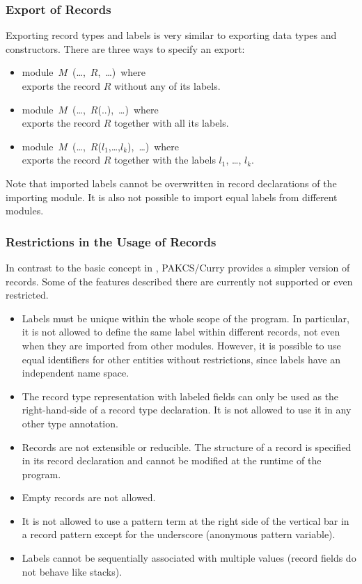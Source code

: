 \documentclass[11pt,fleqn]{article}
\renewcommand{\tt}{\usefont{OT1}{cmtt}{m}{n}\selectfont}
\newcommand{\codefont}{\tt}
\newcommand{\code}[1]{\mbox{\codefont #1}}
\begin{document}
\subsubsection{Export of Records}
\label{sec-exprecs}

Exporting record types and labels is very similar to exporting
data types and constructors. There are three ways 
to specify an export:
\begin{itemize}
\item \code{module $M$ (\ldots, $R$, \ldots) where} \\
  exports the record $R$ without any of its labels.
\item \code{module $M$ (\ldots, $R$(..), \ldots) where} \\
  exports the record $R$ together with all its labels.
\item \code{module $M$ (\ldots, $R$($l_1$,\ldots,$l_k$), \ldots) where} \\
  exports the record $R$ together with the labels $l_1$, \ldots, $l_k$.
\end{itemize}
%
Note that imported labels cannot be overwritten in record declarations
of the importing module. It is also not possible to import equal labels
from different modules.


\subsubsection{Restrictions in the Usage of Records}
\label{sec-restrinrecs}

In contrast to the basic concept in \cite{Leijen05}, PAKCS/Curry provides a
simpler version of records. Some of the features described there are
currently not supported or even restricted.

\begin{itemize}
\item Labels must be unique within the whole scope of the program.
  In particular, it is not allowed to define the same label within
  different records, not even when they are imported from other
  modules. However, it is possible to use equal identifiers for other
  entities without restrictions, since labels have an independent 
  name space.
\item The record type representation with labeled fields can only be
  used as the right-hand-side of a record type declaration. It is
  not allowed to use it in any other type annotation.
\item Records are not extensible or reducible. The structure of a
  record is specified in its record declaration and cannot be
  modified at the runtime of the program.
\item Empty records are not allowed.
\item It is not allowed  to use a pattern term
  at the right side of the vertical bar in a record pattern
  except for the underscore (anonymous pattern variable).
\item Labels cannot be sequentially associated with multiple values
  (record fields do not behave like stacks).
\end{itemize}
\end{document}
